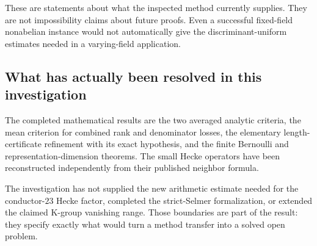 These are statements about what the inspected method currently supplies.
They are not impossibility claims about future proofs. Even a successful
fixed-field nonabelian instance would not automatically give the
discriminant-uniform estimates needed in a varying-field application.

\subsection{What has actually been resolved in this investigation}

The completed mathematical results are the two averaged analytic criteria,
the mean criterion for combined rank and denominator losses, the elementary length-certificate
refinement with its exact hypothesis, and the finite Bernoulli and
representation-dimension theorems. The small Hecke operators have been
reconstructed independently from their published neighbor formula.

The investigation has not supplied the new arithmetic estimate needed
for the conductor-$23$ Hecke factor, completed the strict-Selmer
formalization, or extended the claimed K-group vanishing range.
Those boundaries are part of the result: they specify exactly what
would turn a method transfer into a solved open problem.
